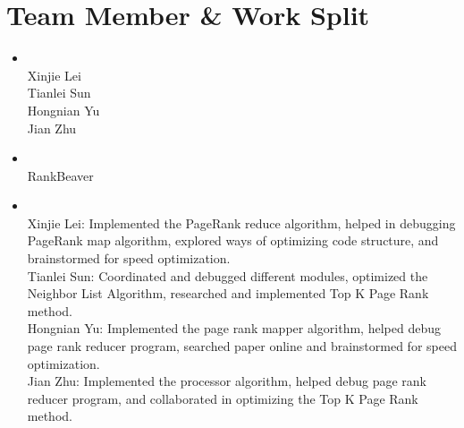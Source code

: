 \section{Team Member \& Work Split}
\medskip
\begin{itemize}

    \item {} \\
    Xinjie Lei\\
    Tianlei Sun\\
    Hongnian Yu\\
    Jian Zhu
    
    \item {} \\
    RankBeaver
    
    \item {} \\
    Xinjie Lei: Implemented the PageRank reduce algorithm, helped in debugging PageRank map algorithm, explored ways of optimizing code structure, and brainstormed for speed optimization.\\
    Tianlei Sun: Coordinated and debugged different modules, optimized the Neighbor List Algorithm, researched and implemented Top K Page Rank method.\\
    Hongnian Yu: Implemented the page rank mapper algorithm, helped debug page rank reducer program, searched paper online and brainstormed for speed optimization.\\
    Jian Zhu: Implemented the processor algorithm, helped debug page rank reducer program, and collaborated in optimizing the Top K Page Rank method.

\end{itemize}



